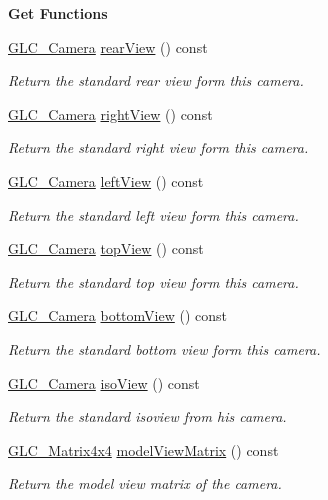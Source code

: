 \begin{Indent}{\bf Get Functions}
\begin{DoxyCompactItemize}
\hyperlink{class_g_l_c___camera}{G\-L\-C\-\_\-\-Camera} \hyperlink{class_g_l_c___camera_a5172cd61f4fbef9d118eeda588cab1dc}{rear\-View} () const 
\begin{DoxyCompactList}\small\item\em Return the standard rear view form this camera. \end{DoxyCompactList}\item 
\hyperlink{class_g_l_c___camera}{G\-L\-C\-\_\-\-Camera} \hyperlink{class_g_l_c___camera_af76efc467c96d2cf2e6ff82026081625}{right\-View} () const 
\begin{DoxyCompactList}\small\item\em Return the standard right view form this camera. \end{DoxyCompactList}\item 
\hyperlink{class_g_l_c___camera}{G\-L\-C\-\_\-\-Camera} \hyperlink{class_g_l_c___camera_a506af19871f54a76580b2acd13ac8ae5}{left\-View} () const 
\begin{DoxyCompactList}\small\item\em Return the standard left view form this camera. \end{DoxyCompactList}\item 
\hyperlink{class_g_l_c___camera}{G\-L\-C\-\_\-\-Camera} \hyperlink{class_g_l_c___camera_a621bbcef676d05742c67f331ea787398}{top\-View} () const 
\begin{DoxyCompactList}\small\item\em Return the standard top view form this camera. \end{DoxyCompactList}\item 
\hyperlink{class_g_l_c___camera}{G\-L\-C\-\_\-\-Camera} \hyperlink{class_g_l_c___camera_a3ff9738f10b21551174c6d1c63796954}{bottom\-View} () const 
\begin{DoxyCompactList}\small\item\em Return the standard bottom view form this camera. \end{DoxyCompactList}\item 
\hyperlink{class_g_l_c___camera}{G\-L\-C\-\_\-\-Camera} \hyperlink{class_g_l_c___camera_a975d6edfe2c6a3f6c0c379c0ad5199a4}{iso\-View} () const 
\begin{DoxyCompactList}\small\item\em Return the standard isoview from his camera. \end{DoxyCompactList}\item 
\hyperlink{class_g_l_c___matrix4x4}{G\-L\-C\-\_\-\-Matrix4x4} \hyperlink{class_g_l_c___camera_a4e56bb7721f3f1d2b9ffb83fa2a400b7}{model\-View\-Matrix} () const 
\begin{DoxyCompactList}\small\item\em Return the model view matrix of the camera. \end{DoxyCompactList}\end{DoxyCompactItemize}
\end{Indent}
